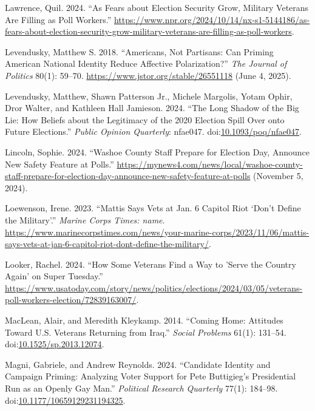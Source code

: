 \documentclass[
  12pt,
  letterpaper,
]{article}
\newlength{\cslhangindent}
\newenvironment{CSLReferences}[2] %
 {\begin{list}{}{%
  \setlength{\itemindent}{0pt}
  \setlength{\leftmargin}{0pt}
  \setlength{\parsep}{0pt}
  \ifodd #1
   \setlength{\leftmargin}{\cslhangindent}
   \setlength{\itemindent}{-1\cslhangindent}
  \fi
  \setlength{\itemsep}{#2\baselineskip}}}
 {\end{list}}
\begin{document}
\begin{CSLReferences}{1}{1}
Lawrence, Quil. 2024. {``As Fears about Election Security Grow, Military
Veterans Are Filling as Poll Workers.''}
\url{https://www.npr.org/2024/10/14/nx-s1-5144186/as-fears-about-election-security-grow-military-veterans-are-filling-as-poll-workers}.

Levendusky, Matthew S. 2018. {``Americans, {Not Partisans}: {Can Priming
American National Identity Reduce Affective Polarization}?''} \emph{The
Journal of Politics} 80(1): 59--70.
\url{https://www.jstor.org/stable/26551118} (June 4, 2025).

Levendusky, Matthew, Shawn Patterson Jr., Michele Margolis, Yotam Ophir,
Dror Walter, and Kathleen Hall Jamieson. 2024. {``The {Long Shadow} of
the {Big Lie}: {How Beliefs} about the {Legitimacy} of the 2020
{Election Spill Over} onto {Future Elections}.''} \emph{Public Opinion
Quarterly}: nfae047.
doi:\href{https://doi.org/10.1093/poq/nfae047}{10.1093/poq/nfae047}.

Lincoln, Sophie. 2024. {``Washoe {County} Staff Prepare for {Election
Day}, Announce New Safety Feature at Polls.''}
\url{https://mynews4.com/news/local/washoe-county-staff-prepare-for-election-day-announce-new-safety-feature-at-polls}
(November 5, 2024).

Loewenson, Irene. 2023. {``Mattis Says Vets at {Jan}. 6 {Capitol} Riot
{`Don't Define the Military'}.''} \emph{Marine Corps Times: name}.
\url{https://www.marinecorpstimes.com/news/your-marine-corps/2023/11/06/mattis-says-vets-at-jan-6-capitol-riot-dont-define-the-military/}.

Looker, Rachel. 2024. {``How Some Veterans Find a Way to 'Serve the
Country Again' on {Super Tuesday}.''}
\url{https://www.usatoday.com/story/news/politics/elections/2024/03/05/veterans-poll-workers-election/72839163007/}.

MacLean, Alair, and Meredith Kleykamp. 2014. {``Coming {Home}:
{Attitudes} Toward {U}.{S}. {Veterans Returning} from {Iraq}.''}
\emph{Social Problems} 61(1): 131--54.
doi:\href{https://doi.org/10.1525/sp.2013.12074}{10.1525/sp.2013.12074}.

Magni, Gabriele, and Andrew Reynolds. 2024. {``Candidate {Identity} and
{Campaign Priming}: {Analyzing Voter Support} for {Pete Buttigieg}'s
{Presidential Run} as an {Openly Gay Man}.''} \emph{Political Research
Quarterly} 77(1): 184--98.
doi:\href{https://doi.org/10.1177/10659129231194325}{10.1177/10659129231194325}.


\end{CSLReferences}
\end{document}

